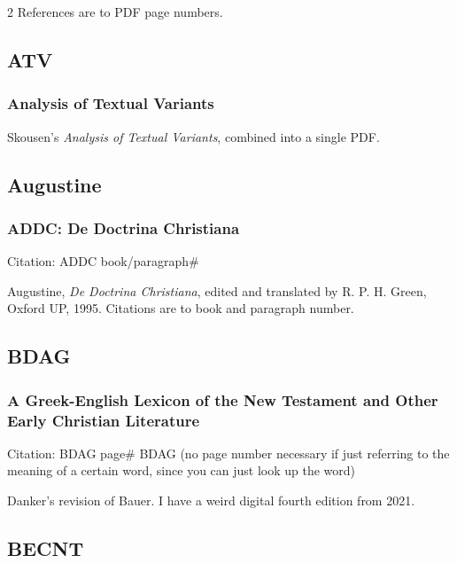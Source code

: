 \begin{multicols}{2}
			References are to PDF page numbers.
			
	\subsection*{ATV}
	
		\subsubsection*{Analysis of Textual Variants}
		
			Skousen's \textit{Analysis of Textual Variants}, combined into a single PDF.
			
	\subsection*{Augustine}
	
		\subsubsection*{ADDC: De Doctrina Christiana}
		
			Citation:
				ADDC book/paragraph\#
			
			Augustine, \textit{De Doctrina Christiana}, edited and translated by R. P. H. Green, Oxford UP, 1995. Citations are to book and paragraph number.
			
	\subsection*{BDAG}
	
		\subsubsection*{A Greek-English Lexicon of the New Testament and Other Early Christian Literature}
		
			Citation:
				BDAG page\#
				BDAG (no page number necessary if just referring to the meaning of a certain word, since you can just look up the word)
		
			Danker's revision of Bauer. I have a weird digital fourth edition from 2021.
			
	\subsection*{BECNT}
	

\end{multicols}
